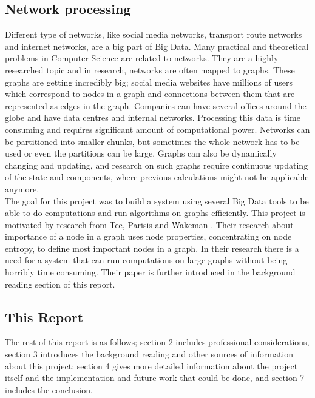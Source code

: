 \documentclass{article}
\theoremstyle{definition}
\begin{document}
\subsection{Network processing}
Different type of networks, like social media networks, transport route networks and internet networks, are a big part of Big Data. Many practical and theoretical problems in Computer Science are related to networks. They are a highly researched topic and in research, networks are often mapped to graphs. These graphs are getting incredibly big; social media websites have millions of users which correspond to nodes in a graph and connections between them that are represented as edges in the graph. Companies can have several offices around the globe and have data centres and internal networks. Processing this data is time consuming and requires significant amount of computational power. Networks can be partitioned into smaller chunks, but sometimes the whole network has to be used or even the partitions can be large. Graphs can also be dynamically changing and updating, and research on such graphs require continuous updating of the state and components, where previous calculations might not be applicable anymore. \\

The goal for this project was to build a system using several Big Data tools to be able to do computations and run algorithms on graphs efficiently. This project is motivated by research from Tee, Parisis and Wakeman \cite{Tee2016b}. Their research about importance of a node in a graph uses node properties, concentrating on node entropy, to define most important nodes in a graph. In their research there is a need for a system that can run computations on large graphs without being horribly time consuming. Their paper is further introduced in the background reading section of this report. \\

\subsection{This Report}
The rest of this report is as follows; section 2 includes professional considerations, section 3 introduces the background reading and other sources of information about this project; section 4 gives more detailed information about the project itself and the implementation and future work that could be done, and section 7 includes the conclusion. \\
\end{document}
